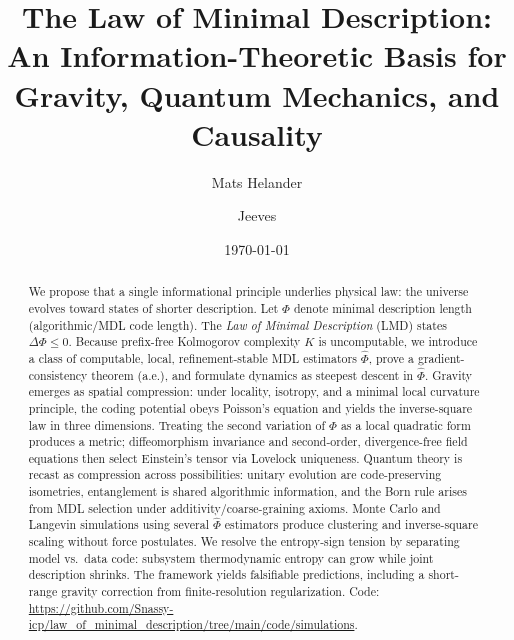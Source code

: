 \documentclass[aps,preprint,onecolumn,longbibliography,nofootinbib]{revtex4-2}
\numberwithin{equation}{section}        %
\begin{document}
\title{The Law of Minimal Description: An Information-Theoretic Basis for Gravity, Quantum Mechanics, and Causality}

\author{Mats Helander}
\author{Jeeves}

\date{\today}

\begin{abstract}
We propose that a single informational principle underlies physical law: the universe evolves toward states of shorter description. Let $\Phi$ denote minimal description length (algorithmic/MDL code length). The \emph{Law of Minimal Description} (LMD) states $\Delta\Phi\le 0$. Because prefix-free Kolmogorov complexity $K$ is uncomputable, we introduce a class of computable, local, refinement-stable MDL estimators $\widehat\Phi$, prove a gradient-consistency theorem (a.e.), and formulate dynamics as steepest descent in $\widehat\Phi$. Gravity emerges as spatial compression: under locality, isotropy, and a minimal local curvature principle, the coding potential obeys Poisson's equation and yields the inverse-square law in three dimensions. Treating the second variation of $\Phi$ as a local quadratic form produces a metric; diffeomorphism invariance and second-order, divergence-free field equations then select Einstein's tensor via Lovelock uniqueness. Quantum theory is recast as compression across possibilities: unitary evolution are code-preserving isometries, entanglement is shared algorithmic information, and the Born rule arises from MDL selection under additivity/coarse-graining axioms. Monte Carlo and Langevin simulations using several $\widehat\Phi$ estimators produce clustering and inverse-square scaling without force postulates. We resolve the entropy-sign tension by separating model vs.\ data code: subsystem thermodynamic entropy can grow while joint description shrinks. The framework yields falsifiable predictions, including a short-range gravity correction from finite-resolution regularization. Code: \url{https://github.com/Snassy-icp/law_of_minimal_description/tree/main/code/simulations}.
\end{abstract}

\maketitle
{}
\thispagestyle{empty}
\vspace{-0.5em}
\end{document}
